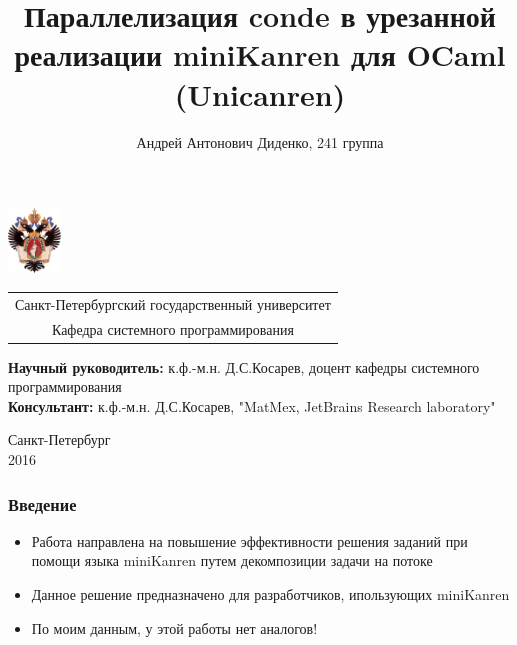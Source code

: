 \documentclass{beamer}
\title[Параллелизация miniKanren]{Параллелизация conde в урезанной реализации miniKanren для OCaml (Unicanren)}
\institute[СПбГУ]{}
\author[Андрей Диденко]{Андрей Антонович Диденко, 241 группа}
\begin{document}
{
\begin{frame}
  \includegraphics[width=1.4cm]{pictures/SPbGU_Logo.png}
  \vspace{-35pt}
  \hspace{-10pt}
  \begin{center}
    \begin{tabular}{c}
      \scriptsize{Санкт-Петербургский государственный университет} \\
      \scriptsize{Кафедра системного программирования}
    \end{tabular}
    \titlepage
  \end{center}

  \btVFill

  {\scriptsize
  {\bfseries Научный руководитель:} к.ф.-м.н. Д.С.Косарев, доцент кафедры системного программирования \\
  {\bfseries Консультант:}  к.ф.-м.н. Д.С.Косарев, "MatMex, JetBrains Research laboratory" \\
  }
  \begin{center}
    \vspace{5pt}
    \scriptsize{Санкт-Петербург\\
      2016}
  \end{center}

\end{frame}
}

\begin{frame}[fragile]
  \frametitle{Введение}
  \begin{itemize}
    \item Работа направлена на повышение эффективности решения заданий при помощи языка miniKanren путем декомпозиции задачи на потоке
    \item Данное решение предназначено для разработчиков, ипользующих miniKanren
    \item По моим данным, у этой работы нет аналогов!
  \end{itemize}
\end{frame}
\end{document}
